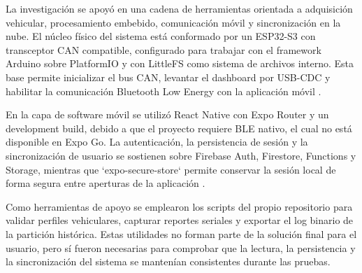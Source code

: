 \documentclass[12pt,letterpaper]{report}
\begin{document}
\label{sec:herramientas-utilizadas}

La investigación se apoyó en una cadena de herramientas orientada a adquisición vehicular, procesamiento embebido, comunicación móvil y sincronización en la nube. El núcleo físico del sistema está conformado por un ESP32-S3 con transceptor CAN compatible, configurado para trabajar con el framework Arduino sobre PlatformIO y con LittleFS como sistema de archivos interno. Esta base permite inicializar el bus CAN, levantar el dashboard por USB-CDC y habilitar la comunicación Bluetooth Low Energy con la aplicación móvil \cite{espressif2026_esp32s3_get_started,espressif2026_esp32s3_usb_otg_console,espressif2026_esp32s3_ble_overview}.

En la capa de software móvil se utilizó React Native con Expo Router y un development build, debido a que el proyecto requiere BLE nativo, el cual no está disponible en Expo Go. La autenticación, la persistencia de sesión y la sincronización de usuario se sostienen sobre Firebase Auth, Firestore, Functions y Storage, mientras que `expo-secure-store` permite conservar la sesión local de forma segura entre aperturas de la aplicación \cite{expo2026_sdk_support,expo2026_development_build}.

Como herramientas de apoyo se emplearon los scripts del propio repositorio para validar perfiles vehiculares, capturar reportes seriales y exportar el log binario de la partición histórica. Estas utilidades no forman parte de la solución final para el usuario, pero sí fueron necesarias para comprobar que la lectura, la persistencia y la sincronización del sistema se mantenían consistentes durante las pruebas.
\end{document}
